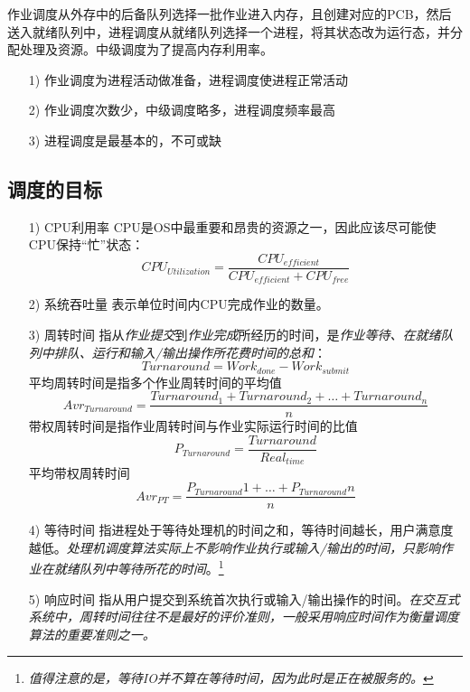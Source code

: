     作业调度从外存中的后备队列选择一批作业进入内存，且创建对应的PCB，然后送入就绪队列中，进程调度从就绪队列选择一个进程，将其状态改为运行态，并分配处理及资源。中级调度为了提高内存利用率。

\begin{itemize}
    \item [1)] 作业调度为进程活动做准备，进程调度使进程正常活动
    \item [2)] 作业调度次数少，中级调度略多，进程调度频率最高
    \item [3)] 进程调度是最基本的，不可或缺
\end{itemize}

\subsection{调度的目标}

\begin{itemize}
    \item [1)] CPU利用率
    \subitem CPU是OS中最重要和昂贵的资源之一，因此应该尽可能使CPU保持“忙”状态：
    \subitem $$CPU_{Utilization} = \frac{CPU_{efficient}}{CPU_{efficient} + CPU_{free}}$$
    \item [2)] 系统吞吐量
    \subitem 表示单位时间内CPU完成作业的数量。
    \item [3)] 周转时间
    \subitem 指从\emph{作业提交}到\emph{作业完成}所经历的时间，是\emph{作业等待、在就绪队列中排队、运行和输入/输出操作所花费时间的总和}：
    \subitem $$Turnaround = Work_{done} - Work_{submit}$$
    \subitem 平均周转时间是指多个作业周转时间的平均值
    \subitem $$Avr_{Turnaround} = \frac{Turnaround_1 + Turnaround_2 + \dots + Turnaround_n}{n}$$
    \subitem 带权周转时间是指作业周转时间与作业实际运行时间的比值
    \subitem $$P_{Turnaround} = \frac{Turnaround}{Real_{time}}$$
    \subitem 平均带权周转时间
    \subitem $$Avr_{PT} = \frac{P_{Turnaround}1 + \dots + P_{Turnaround}n}{n}$$
    \item [4)] 等待时间
    \subitem 指进程处于等待处理机的时间之和，等待时间越长，用户满意度越低。\emph{\color{red}处理机调度算法实际上不影响作业执行或输入/输出的时间，只影响作业在就绪队列中等待所花的时间}。\footnote[1]{\emph{值得注意的是，\color{red}等待IO并不算在等待时间，因为此时是正在被服务的。}}
    \item [5)] 响应时间
    \subitem 指从用户提交到系统首次执行或输入/输出操作的时间。\emph{在交互式系统中，周转时间往往不是最好的评价准则，一般采用响应时间作为衡量调度算法的重要准则之一。}
\end{itemize}

